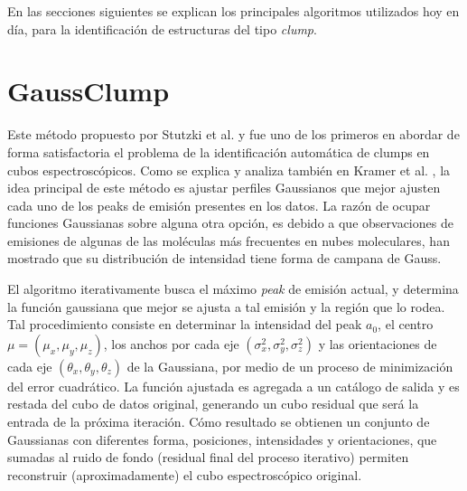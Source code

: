 En las secciones siguientes se explican los principales algoritmos utilizados hoy en día, para la identificación de estructuras del tipo \textit{clump}.




\section{GaussClump}
Este método propuesto por Stutzki et al. \cite{Stutzki} y fue uno de los primeros en abordar de forma satisfactoria el problema de la identificación automática de clumps en cubos espectroscópicos. Como se explica y analiza también en Kramer et al. \cite{Kramer}, la idea principal de este método es ajustar perfiles Gaussianos que mejor ajusten cada uno de los peaks de emisión presentes en los datos. La razón de ocupar funciones Gaussianas sobre alguna otra opción, es debido a que observaciones de emisiones de algunas de las moléculas más frecuentes en nubes moleculares, han mostrado que su distribución de intensidad tiene forma de campana de Gauss.

El algoritmo iterativamente busca el máximo \textit{peak} de emisión actual, y determina la función gaussiana que mejor se ajusta a tal emisión y la región que lo rodea. Tal procedimiento consiste en determinar la intensidad del peak $a_0$, el centro $\mu=(\mu_x, \mu_y, \mu_z)$, los anchos por cada eje $(\sigma_x^2, \sigma_y^2, \sigma_z^2)$ y las orientaciones de cada eje $(\theta_x, \theta_y, \theta_z)$ de la Gaussiana, por medio de un proceso de minimización del error cuadrático. La función ajustada es agregada a un catálogo de salida y es restada del cubo de datos original, generando un cubo residual que será la entrada de la próxima iteración. Cómo resultado se obtienen un conjunto de Gaussianas con diferentes forma, posiciones, intensidades y orientaciones, que sumadas al ruido de fondo (residual final del proceso iterativo) permiten reconstruir (aproximadamente) el cubo espectroscópico original.


